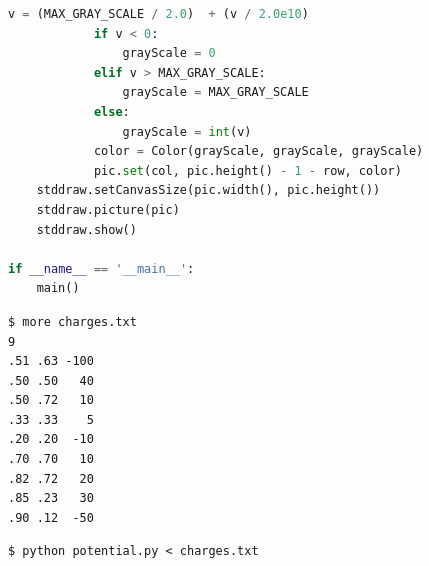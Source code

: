 \documentclass[8pt,a4paper,compress]{beamer}
\begin{document}
\begin{frame}[fragile]
\pause

\begin{lstlisting}[language=Python]
            v = (MAX_GRAY_SCALE / 2.0)  + (v / 2.0e10)
            if v < 0:
                grayScale = 0
            elif v > MAX_GRAY_SCALE:
                grayScale = MAX_GRAY_SCALE
            else:
                grayScale = int(v)            
            color = Color(grayScale, grayScale, grayScale)
            pic.set(col, pic.height() - 1 - row, color)
    stddraw.setCanvasSize(pic.width(), pic.height())
    stddraw.picture(pic)
    stddraw.show()

if __name__ == '__main__':
    main()
\end{lstlisting}

\begin{minipage}{150pt}
\pause

\begin{lstlisting}[language={}]
$ more charges.txt
9
.51 .63 -100
.50 .50   40
.50 .72   10
.33 .33    5
.20 .20  -10
.70 .70   10
.82 .72   20
.85 .23   30
.90 .12  -50
\end{lstlisting}

\pause

\begin{lstlisting}[language={}]
$ python potential.py < charges.txt
\end{lstlisting}
\end{minipage}%
\hfill
\begin{minipage}{150pt}
\begin{center}
\end{center}
\end{minipage}
\end{frame}
\end{document}

